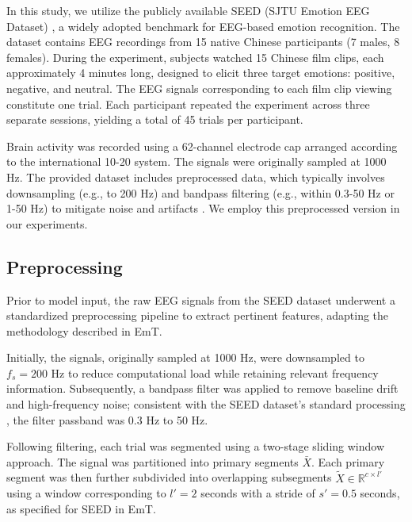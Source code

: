 \documentclass[runningheads]{llncs}
\begin{document}
In this study, we utilize the publicly available SEED (SJTU Emotion EEG Dataset) \cite{cite_seed_dataset_zheng, cite_seed_dataset_duan}, a widely adopted benchmark for EEG-based emotion recognition. The dataset contains EEG recordings from 15 native Chinese participants (7 males, 8 females). During the experiment, subjects watched 15 Chinese film clips, each approximately 4 minutes long, designed to elicit three target emotions: positive, negative, and neutral. The EEG signals corresponding to each film clip viewing constitute one trial. Each participant repeated the experiment across three separate sessions, yielding a total of 45 trials per participant.

Brain activity was recorded using a 62-channel electrode cap arranged according to the international 10-20 system. The signals were originally sampled at 1000 Hz. The provided dataset includes preprocessed data, which typically involves downsampling (e.g., to 200 Hz) and bandpass filtering (e.g., within 0.3-50 Hz or 1-50 Hz) to mitigate noise and artifacts \cite{cite_seed_dataset_zheng}. We employ this preprocessed version in our experiments. %


\subsection{Preprocessing}
\label{subsec:preprocessing}
Prior to model input, the raw EEG signals from the SEED dataset underwent a standardized preprocessing pipeline to extract pertinent features, adapting the methodology described in EmT\cite{cite_ding_emt}. %

Initially, the signals, originally sampled at 1000 Hz, were downsampled to $f_s = 200$ Hz to reduce computational load while retaining relevant frequency information. Subsequently, a bandpass filter was applied to remove baseline drift and high-frequency noise; consistent with the SEED dataset's standard processing \cite{cite_seed_dataset_zheng}, the filter passband was 0.3 Hz to 50 Hz. %

Following filtering, each trial was segmented using a two-stage sliding window approach. The signal was partitioned into primary segments $\bar{X}$. Each primary segment was then further subdivided into overlapping subsegments $\tilde{X} \in \mathbb{R}^{c \times l'}$ using a window corresponding to $l'=2$ seconds with a stride of $s'=0.5$ seconds, as specified for SEED in EmT\cite{cite_ding_emt}. %
\end{document}
